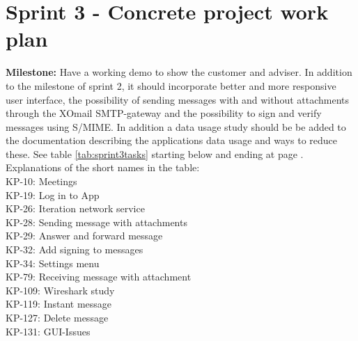 \section{Sprint 3 - Concrete project work plan}

\textbf{Milestone:} Have a working demo to show the customer and adviser. In addition to the milestone of sprint 2, it should incorporate better and more responsive user interface, the possibility of sending messages with and without attachments through the XOmail SMTP-gateway and the possibility to sign and verify messages using S/MIME. In addition a data usage study should be be added to the documentation describing the applications data usage and ways to reduce these.
\newline
\newline
See table \ref{tab:sprint3tasks} starting below and ending at page \pageref{tab:sprint3tasks}.
\newline
\newline
Explanations of the short names in the table:\\
KP-10: Meetings\\
KP-19: Log in to App\\
KP-26: Iteration network service\\
KP-28: Sending message with attachments\\
KP-29: Answer and forward message\\
KP-32: Add signing to messages\\
KP-34: Settings menu\\
KP-79: Receiving message with attachment\\
KP-109: Wireshark study\\
KP-119: Instant message\\
KP-127: Delete message\\
KP-131: GUI-Issues\\



